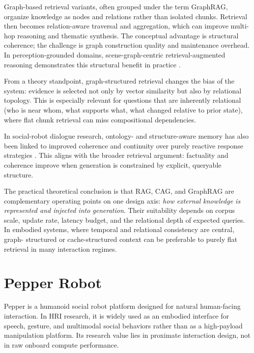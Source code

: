   Graph-based retrieval variants, often grouped under the term GraphRAG, organize knowledge as nodes and relations rather than isolated chunks. Retrieval then becomes relation-aware traversal and
  aggregation, which can improve multi-hop reasoning and thematic synthesis. The conceptual advantage is structural coherence; the challenge is graph construction quality and maintenance overhead. In
  perception-grounded domains, scene-graph-centric retrieval-augmented reasoning demonstrates this structural benefit in practice \cite{wang_indvissgg_2025}.

  From a theory standpoint, graph-structured retrieval changes the bias of the system: evidence is selected not only by vector similarity but also by relational topology. This is especially relevant for
  questions that are inherently relational (who is near whom, what supports what, what changed relative to prior state), where flat chunk retrieval can miss compositional dependencies.

  In social-robot dialogue research, ontology- and structure-aware memory has also been linked to improved coherence and continuity over purely reactive response strategies
  \cite{grassi2022knowledge,grassi2023knowledge}. This aligns with the broader retrieval argument: factuality and coherence improve when generation is constrained by explicit, queryable structure.

  The practical theoretical conclusion is that RAG, CAG, and GraphRAG are complementary operating points on one design axis: \emph{how external knowledge is represented and injected into generation}.
  Their suitability depends on corpus scale, update rate, latency budget, and the relational depth of expected queries. In embodied systems, where temporal and relational consistency are central, graph-
  structured or cache-structured context can be preferable to purely flat retrieval in many interaction regimes.

  \section{Pepper Robot}

  Pepper is a humanoid social robot platform designed for natural human-facing interaction. In HRI research, it is widely used as an embodied interface for speech, gesture, and multimodal social
  behaviors rather than as a high-payload manipulation platform. Its research value lies in proximate interaction design, not in raw onboard compute performance.

